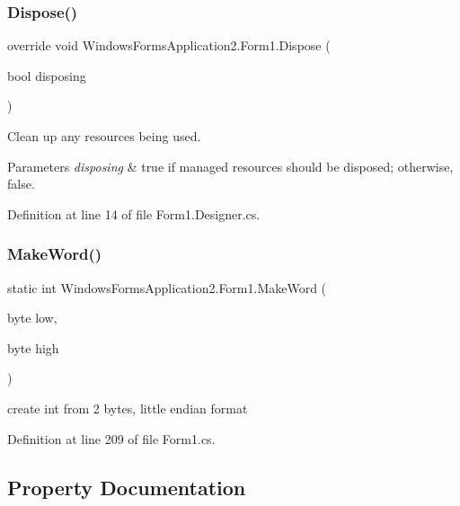 \subsubsection{\texorpdfstring{Dispose()}{Dispose()}}
{\footnotesize\ttfamily override void Windows\+Forms\+Application2.\+Form1.\+Dispose (\begin{DoxyParamCaption}\item[{bool}]{disposing }\end{DoxyParamCaption})\hspace{0.3cm}{\ttfamily [protected]}}



Clean up any resources being used. 


\begin{DoxyParams}{Parameters}
{\em disposing} & true if managed resources should be disposed; otherwise, false.\\
\hline
\end{DoxyParams}


Definition at line 14 of file Form1.\+Designer.\+cs.

\hypertarget{class_windows_forms_application2_1_1_form1_a5b38b3c8dc487bcfd14f3e82e7c7a178}{}\label{class_windows_forms_application2_1_1_form1_a5b38b3c8dc487bcfd14f3e82e7c7a178} 
\subsubsection{\texorpdfstring{Make\+Word()}{MakeWord()}}
{\footnotesize\ttfamily static int Windows\+Forms\+Application2.\+Form1.\+Make\+Word (\begin{DoxyParamCaption}\item[{byte}]{low,  }\item[{byte}]{high }\end{DoxyParamCaption})\hspace{0.3cm}{\ttfamily [static]}}



create int from 2 bytes, little endian format 



Definition at line 209 of file Form1.\+cs.



\subsection{Property Documentation}
\hypertarget{class_windows_forms_application2_1_1_form1_a8591054f8f980fd29da1f3ad39cff10a}{}\label{class_windows_forms_application2_1_1_form1_a8591054f8f980fd29da1f3ad39cff10a} 
